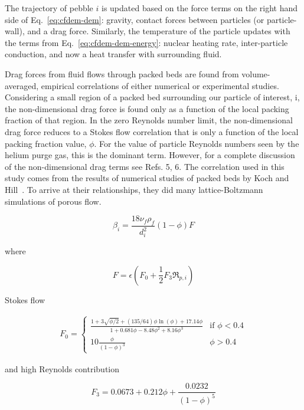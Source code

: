 The trajectory of pebble $i$ is updated based on the force terms on the right hand side of Eq.~\ref{eq:cfdem-dem}: gravity, contact forces between particles (or particle-wall), and a drag force. Similarly, the temperature of the particle updates with the terms from Eq.~\ref{eq:cfdem-dem-energy}: nuclear heating rate, inter-particle conduction, and now a heat transfer with surrounding fluid.

Drag forces from fluid flows through packed beds are found from volume-averaged, empirical correlations of either numerical or experimental studies. Considering a small region of a packed bed surrounding our particle of interest, i, the non-dimensional drag force is found only as a function of the local packing fraction of that region. In the zero Reynolds number limit, the non-dimensional drag force reduces to a Stokes flow correlation that is only a function of the local packing fraction value, $\phi$. For the value of particle Reynolds numbers seen by the helium purge gas, this is the dominant term. However, for a complete discussion of the non-dimensional drag terms see Refs. 5, 6. The correlation used in this study comes from the results of numerical studies of packed beds by Koch and Hill~\cite{Koch2001, Gruber2012, Benyahia2006}. To arrive at their relationships, they did many lattice-Boltzmann simulations of porous flow.

\begin{equation}
\beta_{i} = \frac{18\nu_f\rho_f}{d_{i}^2}(1-\phi) F
\end{equation}

where 

\begin{equation}
F = \epsilon (F_0 + \frac{1}{2}F_3 \Re_{p,i})
\end{equation}

Stokes flow

\begin{align}
F_0 = 
	\begin{cases}
    		\frac{1+3\sqrt{\phi/2} + (135/64)\phi\ln(\phi) + 17.14\phi}{1 + 0.681\phi - 8.48\phi^2 + 8.16 \phi^3}	& \text{if } \phi < 0.4\\
    		10\frac{\phi}{(1-\phi)^3}              																& \phi > 0.4
	\end{cases}
\end{align}

and high Reynolds contribution

\begin{equation}
F_3 = 0.0673 + 0.212\phi + \frac{0.0232}{(1-\phi)^5}
\end{equation}



